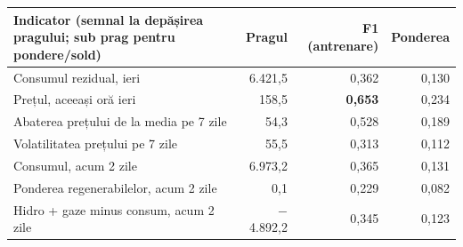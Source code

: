 \begin{tabular}{lrrr}
\toprule
Indicator (semnal la depășirea pragului; sub prag pentru pondere/sold) & Pragul & F1 (antrenare) & Ponderea \\
\midrule
Consumul rezidual, ieri & 6.421,5 & 0,362 & 0,130 \\
Prețul, aceeași oră ieri & 158,5 & \textbf{0,653} & 0,234 \\
Abaterea prețului de la media pe 7 zile & 54,3 & 0,528 & 0,189 \\
Volatilitatea prețului pe 7 zile & 55,5 & 0,313 & 0,112 \\
Consumul, acum 2 zile & 6.973,2 & 0,365 & 0,131 \\
Ponderea regenerabilelor, acum 2 zile & 0,1 & 0,229 & 0,082 \\
Hidro + gaze minus consum, acum 2 zile & $-$4.892,2 & 0,345 & 0,123 \\
\bottomrule
\end{tabular}
